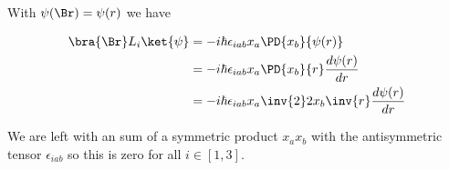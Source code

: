 With $\psi(\Br) = \psi(r)$ we have

\begin{align*}
\bra{\Br} L_i \ket{\psi}
&=
-i \hbar \epsilon_{i a b} x_a \PD{x_b}{\psi(r)}  \\
&=
-i \hbar \epsilon_{i a b} x_a \PD{x_b}{r} \frac{d\psi(r)}{dr}  \\
&=
-i \hbar \epsilon_{i a b} x_a \inv{2} 2 x_b \inv{r} \frac{d\psi(r)}{dr}  \\
\end{align*}

We are left with an sum of a symmetric product $x_a x_b$ with the antisymmetric tensor $\epsilon_{i a b}$ so this is zero for all $i \in [1,3]$.

\EndArticle
